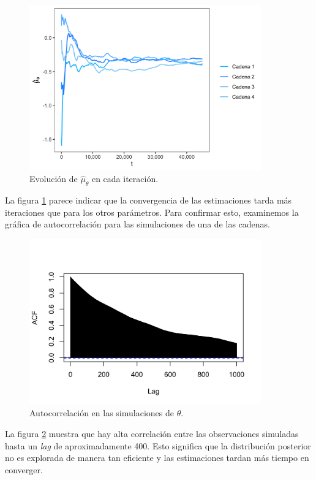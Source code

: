 \documentclass[11pt,a4paper]{article}
\begin{document}
\begin{figure}
\centering\includegraphics[width=10cm]{theta_ergodic_means.png}
\caption{Evolución de $\hat{\mu}_{\theta}$ en cada iteración.}
\label{fig:theta_means}
\end{figure}

La figura \ref{fig:theta_means} parece indicar que la convergencia de las estimaciones tarda más iteraciones que para los otros parámetros. Para confirmar esto, examinemos la gráfica de autocorrelación para las simulaciones de una de las cadenas.\\

\begin{figure}
\centering\includegraphics[width=10cm]{theta_acf.png}
\caption{Autocorrelación en las simulaciones de $\theta$.}
\label{fig:theta_acf}
\end{figure}

La figura \ref{fig:theta_acf} muestra que hay alta correlación entre las observaciones simuladas hasta un \textit{lag} de aproximadamente 400. Esto significa que la distribución posterior no es explorada de manera tan eficiente y las estimaciones tardan más tiempo en converger.\\
\end{document}
